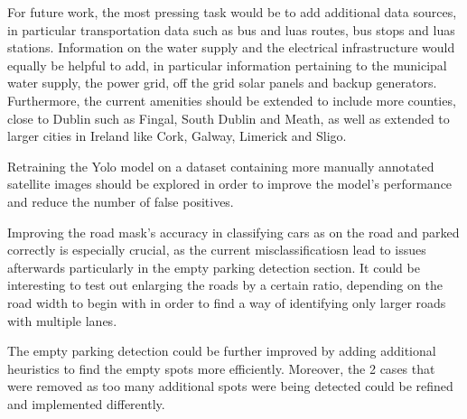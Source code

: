 For future work, the most pressing task would be to add additional data sources,
in particular transportation data such as bus and luas routes, bus stops and
luas stations. Information on the water supply and the electrical infrastructure
would equally be helpful to add, in particular information pertaining to the
municipal water supply, the power grid, off the grid solar panels and backup
generators. Furthermore, the current amenities should be extended to include
more counties, close to Dublin such as Fingal, South Dublin and Meath, as well
as extended to larger cities in Ireland like Cork, Galway, Limerick and Sligo.

Retraining the Yolo model on a dataset containing more manually annotated
satellite images should be explored in order to improve the model's performance
and reduce the number of false positives.

Improving the road mask's accuracy in classifying cars as on the road and parked
correctly is especially crucial, as the current misclassificatiosn lead to
issues afterwards particularly in the empty parking detection section. It could
be interesting to test out enlarging the roads by a certain ratio, depending on
the road width to begin with in order to find a way of identifying only larger
roads with multiple lanes.

The empty parking detection could be further improved by adding additional
heuristics to find the empty spots more efficiently. Moreover, the 2 cases that
were removed as too many additional spots were being detected could be refined
and implemented differently.